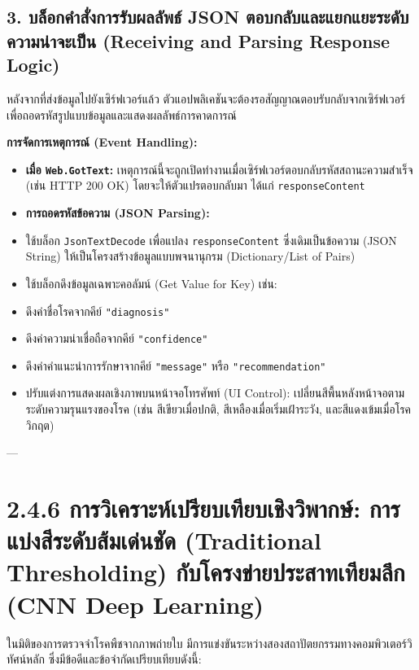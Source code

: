 \documentclass[11pt,a4paper,openany]{report}
\begin{document}
\subsection{3. บล็อกคำสั่งการรับผลลัพธ์ JSON ตอบกลับและแยกแยะระดับความน่าจะเป็น (Receiving and Parsing Response Logic)}


หลังจากที่ส่งข้อมูลไปยังเซิร์ฟเวอร์แล้ว ตัวแอปพลิเคชันจะต้องรอสัญญาณตอบรับกลับจากเซิร์ฟเวอร์ เพื่อถอดรหัสรูปแบบข้อมูลและแสดงผลลัพธ์การคาดการณ์

\textbf{การจัดการเหตุการณ์ (Event Handling):}
\begin{itemize}
  \item \textbf{เมื่อ \texttt{Web.GotText}:} เหตุการณ์นี้จะถูกเปิดทำงานเมื่อเซิร์ฟเวอร์ตอบกลับรหัสสถานะความสำเร็จ (เช่น HTTP 200 OK) โดยจะให้ตัวแปรตอบกลับมา ได้แก่ \texttt{responseContent}
  \item \textbf{การถอดรหัสข้อความ (JSON Parsing):}
  \item ใช้บล็อก \texttt{JsonTextDecode} เพื่อแปลง \texttt{responseContent} ซึ่งเดิมเป็นข้อความ (JSON String) ให้เป็นโครงสร้างข้อมูลแบบพจนานุกรม (Dictionary/List of Pairs)
  \item ใช้บล็อกดึงข้อมูลเฉพาะคอลัมน์ (Get Value for Key) เช่น:
  \item ดึงค่าชื่อโรคจากคีย์ \texttt{"diagnosis"}
  \item ดึงค่าความน่าเชื่อถือจากคีย์ \texttt{"confidence"}
  \item ดึงค่าคำแนะนำการรักษาจากคีย์ \texttt{"message"} หรือ \texttt{"recommendation"}
  \item ปรับแต่งการแสดงผลเชิงภาพบนหน้าจอโทรศัพท์ (UI Control): เปลี่ยนสีพื้นหลังหน้าจอตามระดับความรุนแรงของโรค (เช่น สีเขียวเมื่อปกติ, สีเหลืองเมื่อเริ่มเฝ้าระวัง, และสีแดงเข้มเมื่อโรควิกฤต)
\end{itemize}


---

\section{2.4.6 การวิเคราะห์เปรียบเทียบเชิงวิพากษ์: การแบ่งสีระดับส้มเด่นชัด (Traditional Thresholding) กับโครงข่ายประสาทเทียมลึก (CNN Deep Learning)}


ในมิติของการตรวจจำโรคพืชจากภาพถ่ายใบ มีการแข่งขันระหว่างสองสถาปัตยกรรมทางคอมพิวเตอร์วิทัศน์หลัก ซึ่งมีข้อดีและข้อจำกัดเปรียบเทียบดังนี้:
\end{document}
